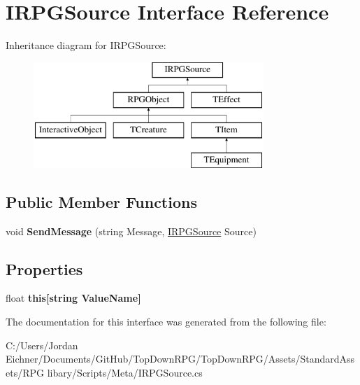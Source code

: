 \hypertarget{interface_i_r_p_g_source}{}\section{I\+R\+P\+G\+Source Interface Reference}
\label{interface_i_r_p_g_source}
Inheritance diagram for I\+R\+P\+G\+Source\+:\begin{figure}[H]
\begin{center}
\leavevmode
\includegraphics[height=4.000000cm]{interface_i_r_p_g_source}
\end{center}
\end{figure}
\subsection*{Public Member Functions}
\begin{DoxyCompactItemize}
\item 
\hypertarget{interface_i_r_p_g_source_a9d5a239ec9c77a2a462541257ab2dd08}{}void {\bfseries Send\+Message} (string Message, \hyperlink{interface_i_r_p_g_source}{I\+R\+P\+G\+Source} Source)\label{interface_i_r_p_g_source_a9d5a239ec9c77a2a462541257ab2dd08}

\end{DoxyCompactItemize}
\subsection*{Properties}
\begin{DoxyCompactItemize}
\item 
\hypertarget{interface_i_r_p_g_source_a4419b7448ec85aac404bdd7c9a9a861e}{}float {\bfseries this\mbox{[}string Value\+Name\mbox{]}}\label{interface_i_r_p_g_source_a4419b7448ec85aac404bdd7c9a9a861e}

\end{DoxyCompactItemize}


The documentation for this interface was generated from the following file\+:\begin{DoxyCompactItemize}
\item 
C\+:/\+Users/\+Jordan Eichner/\+Documents/\+Git\+Hub/\+Top\+Down\+R\+P\+G/\+Top\+Down\+R\+P\+G/\+Assets/\+Standard\+Assets/\+R\+P\+G libary/\+Scripts/\+Meta/I\+R\+P\+G\+Source.\+cs\end{DoxyCompactItemize}
